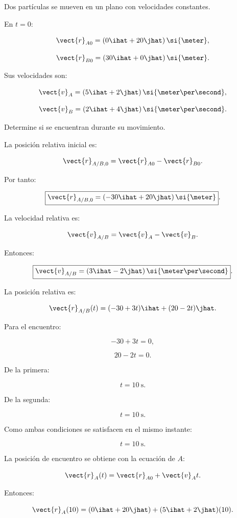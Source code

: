 \begin{ejemplo}

Dos partículas se mueven en un plano
con velocidades constantes.

En \(t=0\):

\[
\vect{r}_{A0}
=
(0\ihat+20\jhat)\,\si{\meter},
\]

\[
\vect{r}_{B0}
=
(30\ihat+0\jhat)\,\si{\meter}.
\]

Sus velocidades son:

\[
\vect{v}_A
=
(5\ihat+2\jhat)\,
\si{\meter\per\second},
\]

\[
\vect{v}_B
=
(2\ihat+4\jhat)\,
\si{\meter\per\second}.
\]

Determine si se encuentran
durante su movimiento.

\end{ejemplo}

La posición relativa inicial es:

\[
\vect{r}_{A/B,0}
=
\vect{r}_{A0}-\vect{r}_{B0}.
\]

Por tanto:

\[
\boxed{
\vect{r}_{A/B,0}
=
(-30\ihat+20\jhat)\,\si{\meter}
}.
\]

La velocidad relativa es:

\[
\vect{v}_{A/B}
=
\vect{v}_A-\vect{v}_B.
\]

Entonces:

\[
\boxed{
\vect{v}_{A/B}
=
(3\ihat-2\jhat)\,
\si{\meter\per\second}
}.
\]

La posición relativa es:

\[
\vect{r}_{A/B}(t)
=
(-30+3t)\ihat+(20-2t)\jhat.
\]

Para el encuentro:

\[
-30+3t=0,
\]

\[
20-2t=0.
\]

De la primera:

\[
t=\SI{10}{\second}.
\]

De la segunda:

\[
t=\SI{10}{\second}.
\]

Como ambas condiciones se satisfacen
en el mismo instante:

\[
\boxed{
t=\SI{10}{\second}
}.
\]

La posición de encuentro se obtiene
con la ecuación de \(A\):

\[
\vect{r}_A(t)
=
\vect{r}_{A0}+\vect{v}_At.
\]

Entonces:

\[
\vect{r}_A(10)
=
(0\ihat+20\jhat)
+
(5\ihat+2\jhat)(10).
\]

